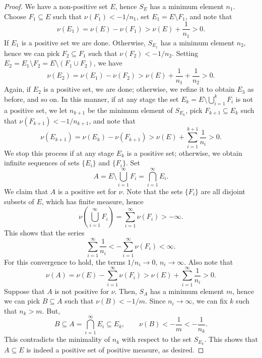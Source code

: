 \documentclass[11pt]{article}
\theoremstyle{definition}
\theoremstyle{remark}
\begin{document}
\begin{proof}
        We have a non-positive set $E$, hence $S_E$ has a minimum element $n_1$.
        Choose $F_1 \subseteq E$ such that $\nu(F_1) < -1 / n_1$, set $E_1 =
        E\setminus F_1$, and note that \[
            \nu(E_1) = \nu(E) - \nu(F_1) > \nu(E) + \frac{1}{n_1} > 0.
        \] If $E_1$ is a positive set we are done. Otherwise, $S_{E_1}$ has a minimum
        element $n_2$, hence we can pick $F_2 \subseteq F_1$ such that $\nu(F_2) < -1
        / n_2$. Setting $E_2 = E_1\setminus F_2 = E\setminus(F_1 \cup F_2)$, we have
        \[
            \nu(E_2) = \nu(E_1) - \nu(F_2) > \nu(E) + \frac{1}{n_1} + \frac{1}{n_2} >
            0.
        \] Again, if $E_2$ is a positive set, we are done; otherwise, we refine it to
        obtain $E_3$ as before, and so on. In this manner, if at any stage the set
        $E_k = E\setminus \bigcup_{i = 1}^k F_i$ is not a positive set, we let $n_{k
        + 1}$ be the minimum element of $S_{E_k}$, pick $F_{k + 1} \subseteq E_k$
        such that $\nu(F_{k + 1}) < -1 / n_{k + 1}$, and note that \[
            \nu(E_{k + 1}) = \nu(E_k) - \nu(F_{k + 1}) > \nu(E) + \sum_{i = 1}^{k +
            1} \frac{1}{n_i} > 0.
        \] We stop this process if at any stage $E_k$ is a positive set; otherwise,
        we obtain infinite sequences of sets $\{E_i\}$ and $\{F_i\}$. Set \[
            A = E\setminus\bigcup_{i = 1}^\infty F_i = \bigcap_{i = 1}^\infty E_i.
        \] We claim that $A$ is a positive set for $\nu$. Note that the sets
        $\{F_i\}$ are all disjoint subsets of $E$, which has finite measure, hence \[
            \nu\left(\bigcup_{i = 1}^\infty F_i\right) = \sum_{i = 1}^\infty \nu(F_i)
            > -\infty.
        \] This shows that the series \[
            \sum_{i = 1}^\infty \frac{1}{n_i} < -\sum_{i = 1}^\infty \nu(F_i) < \infty.
        \] For this convergence to hold, the terms $1 / n_i \to 0$, $n_i \to \infty$.
        Also note that \[
            \nu(A) = \nu(E) - \sum_{i = 1}^\infty \nu(F_i) > \nu(E) + \sum_{i =
            1}^\infty \frac{1}{n_i} > 0.
        \] Suppose that $A$ is not positive for $\nu$. Then, $S_A$ has a minimum
        element $m$, hence we can pick $B \subseteq A$ such that $\nu(B) < -1 / m$.
        Since $n_i \to \infty$, we can fix $k$ such that $n_k > m$. But, \[
            B \subseteq A = \bigcap_{i = 1}^\infty E_i \subseteq E_k, \qquad
            \nu(B) < -\frac{1}{m} < -\frac{1}{n_k}.
        \] This contradicts the minimality of $n_k$ with respect to the set
        $S_{E_k}$. This shows that $A \subseteq E$ is indeed a positive set of
        positive measure, as desired.
    \end{proof}
\end{document}
